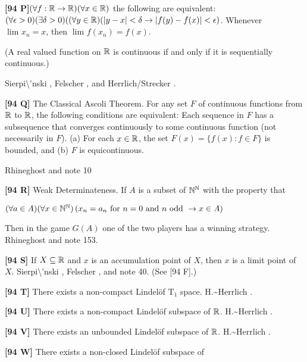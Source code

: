 \smallskip
\item{}{\bf [94 P]}$(\forall f: {\Bbb R}\rightarrow{\Bbb R})
(\forall x\in{\Bbb R})$ the following are equivalent:
 $(\forall\epsilon > 0)(\exists\delta >0)((\forall
y\in\Bbb R)(|y - x|<\delta\rightarrow |f(y) - f(x)|<\epsilon)$.
 Whenever $\lim_{}x_{n} = x$, then
$\lim_{}f(x_{n})=f(x)$.
\item{} (A real valued function on $\Bbb R$ is continuous if and
only if it is  sequentially  continuous.)
\item{}  \ac{Sierpi\'nski} \cite{1918}, Felscher \cite{1979},
and \ac{Herrlich/Strecker} \cite{1997}.
\smallskip
\item{}{\bf [94 Q]} The Classical Ascoli Theorem.  For any set $F$ of
continuous functions from $\Bbb R$ to $\Bbb R$, the following
conditions are equivalent:
 Each sequence in $F$ has a subsequence that
converges continuously to some continuous function (not
necessarily in $F$).
 (a) For each $x\in {\Bbb R}$, the set $F(x) = \{
f(x) : f\in F\}$ is bounded, and
\itemitem{} (b) $F$ is equicontinuous.\par
\ac{Rhineghost} \cite{2000} and note 10 
\smallskip
\item{}{\bf[94 R]} Weak Determinateness.  If $A$ is a subset of
${\Bbb N}^{\Bbb N}$ with the property that\newline
\centerline{
$(\forall a\in A)(\forall x\in {\Bbb N}^{\Bbb N})
\left( x_n = a_n\hbox{ for } n=0 \hbox{ and } n \hbox{ odd } \to
x\in A\right)$}
\newline{}
Then in the game $G(A)$ one of the two players has a winning
strategy. \ac{Rhineghost} \cite{2000} and note 153.
\smallskip
\item{}{\bf [94 S]} If $X\subseteq\Bbb R$ and $x$ is an accumulation
point of $X$, then $x$ is a limit point of $X$. \ac{Sierpi\'nski}
\cite{1918}, Felscher \cite{1979}, and note 40. (See [94 F].)
\smallskip
\item{}{\bf [94 T]} There exists a non-compact Lindel\"of T$_1$ space.
\ac{H.~Herrlich} \cite{2001}.
\smallskip
\item{}{\bf [94 U]} There exists a non-compact Lindel\"of subspace of
$\Bbb R$.  \ac{H.~Herrlich} \cite{2001}.
\smallskip
\item{}{\bf [94 V]} There exists an unbounded Lindel\"of subspace of
$\Bbb R$.  \ac{H.~Herrlich} \cite{2001}.
\smallskip
\item{}{\bf [94 W]} There exists a non-closed Lindel\"of subspace of
